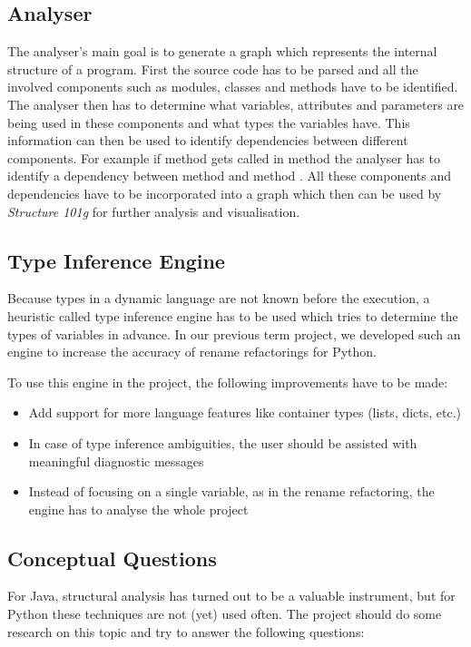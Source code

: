 \documentclass[12pt,halfparskip]{scrartcl}
\begin{document}
\subsection*{Analyser}

The analyser's main goal is to generate a graph which represents the internal structure of a program. First the source code has to be parsed and all the involved components such as modules, classes and methods have to be identified. The analyser then has to determine what variables, attributes and parameters are being used in these components and what types the variables have. This information can then be used to identify dependencies between different components. For example if method  gets called in method  the analyser has to identify a dependency between method  and method . All these components and dependencies have to be incorporated into a graph which then can be used by \emph{Structure 101g} for further analysis and visualisation.

\subsection*{Type Inference Engine}

Because types in a dynamic language are not known before the execution, a heuristic called type inference engine has to be used which tries to determine the types of variables in advance. In our previous term project, we developed such an engine to increase the accuracy of rename refactorings for Python. 

To use this engine in the project, the following improvements have to be made:

\begin{itemize}
	\item Add support for more language features like container types (lists, dicts, etc.)
	\item In case of type inference ambiguities, the user should be assisted with meaningful diagnostic messages
	\item Instead of focusing on a single variable, as in the rename refactoring, the engine has to analyse the whole project
\end{itemize}

\subsection*{Conceptual Questions}

For Java, structural analysis has turned out to be a valuable instrument, but for Python these techniques are not (yet) used often. The project should do some research on this topic and try to answer the following questions:
\end{document}
